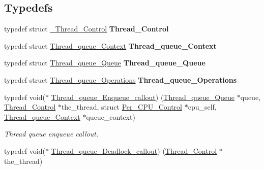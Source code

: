\subsection*{Typedefs}
\begin{DoxyCompactItemize}
\item 
\mbox{\label{group__RTEMSScoreThreadQueue_ga42c67428d17dc0b977ffee7463d1cd76}} 
typedef struct \mbox{\hyperlink{struct__Thread__Control}{\+\_\+\+Thread\+\_\+\+Control}} {\bfseries Thread\+\_\+\+Control}
\item 
\mbox{\label{group__RTEMSScoreThreadQueue_ga2958d2fbd0e3f5a34ded9e43f4579993}} 
typedef struct \mbox{\hyperlink{structThread__queue__Context}{Thread\+\_\+queue\+\_\+\+Context}} {\bfseries Thread\+\_\+queue\+\_\+\+Context}
\item 
\mbox{\label{group__RTEMSScoreThreadQueue_ga474795b5f7cfc1e2c9e6f5411667eb92}} 
typedef struct \mbox{\hyperlink{structThread__queue__Queue}{Thread\+\_\+queue\+\_\+\+Queue}} {\bfseries Thread\+\_\+queue\+\_\+\+Queue}
\item 
\mbox{\label{group__RTEMSScoreThreadQueue_gaf4251ab019ecbfdfea77fd1363282775}} 
typedef struct \mbox{\hyperlink{structThread__queue__Operations}{Thread\+\_\+queue\+\_\+\+Operations}} {\bfseries Thread\+\_\+queue\+\_\+\+Operations}
\item 
typedef void($\ast$ \mbox{\hyperlink{group__RTEMSScoreThreadQueue_ga3dd59055cd68c42978de9cd8e007ce1d}{Thread\+\_\+queue\+\_\+\+Enqueue\+\_\+callout}}) (\mbox{\hyperlink{structThread__queue__Queue}{Thread\+\_\+queue\+\_\+\+Queue}} $\ast$queue, \mbox{\hyperlink{struct__Thread__Control}{Thread\+\_\+\+Control}} $\ast$the\+\_\+thread, struct \mbox{\hyperlink{structPer__CPU__Control}{Per\+\_\+\+C\+P\+U\+\_\+\+Control}} $\ast$cpu\+\_\+self, \mbox{\hyperlink{structThread__queue__Context}{Thread\+\_\+queue\+\_\+\+Context}} $\ast$queue\+\_\+context)
\begin{DoxyCompactList}\small\item\em Thread queue enqueue callout. \end{DoxyCompactList}\item 
typedef void($\ast$ \mbox{\hyperlink{group__RTEMSScoreThreadQueue_gab2878c08655ad0911fe6540a1adaf3a3}{Thread\+\_\+queue\+\_\+\+Deadlock\+\_\+callout}}) (\mbox{\hyperlink{struct__Thread__Control}{Thread\+\_\+\+Control}} $\ast$the\+\_\+thread)

\end{DoxyCompactItemize}
